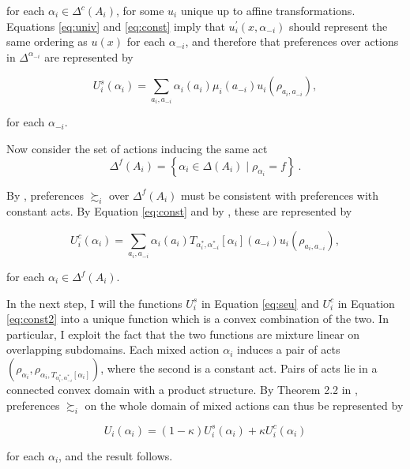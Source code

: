 \begin{linproof}
	for each \( \alpha_i \in \Delta^{c} \left(A_i \right) \), for some \( u_i \) unique up to affine transformations. Equations \eqref{eq:univ} and \eqref{eq:const} imply that \( u^{\prime}_i(x, \alpha_{-i}) \) should represent the same ordering as \( u (x) \) for each \( \alpha_{-i} \), and therefore that preferences over actions in \( \Delta^{\alpha_{-i}} \) are represented by

	\begin{equation}\label{eq:seu}
		U^{s}_i \left( \alpha_i \right) = \sum_{a_i, a_{-i}} \alpha_i(a_i) \mu_{i}(a_{-i}) u_i(\rho_{a_i, a_{-i}}),
	\end{equation}

	for each \( \alpha_{-i} \).

	Now consider the set of actions inducing the same act
	\[ \Delta^{f} \left(A_i \right) = \left\{ \alpha_i \in \Delta \left( A_i \right) \mid \rho_{\alpha_i} = f \right\} \: . \]

	By , preferences \( \succsim_i \) over \( \Delta^{f} \left( A_i \right) \) must be consistent with preferences with constant acts. By Equation \eqref{eq:const} and by , these are represented by

	\begin{equation}\label{eq:const2}
		U^{c}_i \left( \alpha_i \right) = \sum_{a_i, a_{-i}} \alpha_i(a_i) T_{\alpha^{*}_i, \alpha^{*}_{-i}}[ \alpha_i ](a_{-i}) u_i(\rho_{a_i, a_{-i}}) ,
	\end{equation}

	for each \( \alpha_i \in \Delta^{f} \left( A_i \right) \).

	In the next step, I will  the functions \( U_i^{s} \) in Equation \eqref{eq:seu} and \( U_i^{c} \) in Equation \eqref{eq:const2} into a unique function which is a convex combination of the two. In particular, I exploit the fact that the two functions are mixture linear on overlapping subdomains. Each mixed action \( \alpha_i \) induces a pair of acts \( \left(\rho_{\alpha_i}, \rho_{\alpha_i, T_{\alpha^{*}_i, \alpha^{*}_{-i}} [ \alpha_i ]} \right) \), where the second is a constant act. Pairs of acts lie in a connected convex domain with a product structure. By Theorem 2.2 in \cite{chateauneufLocalGlobalAdditive1993}, preferences \( \succsim_i \) on the whole domain of mixed actions can thus be represented by

	\[
		U_i \left( \alpha_i \right) = \left(1 - \kappa \right) U^s_{i} \left( \alpha_i \right) + \kappa U^{c}_{i} \left( \alpha_{i} \right)
	\]

	for each \( \alpha_i \), and the result follows.

\end{linproof}

